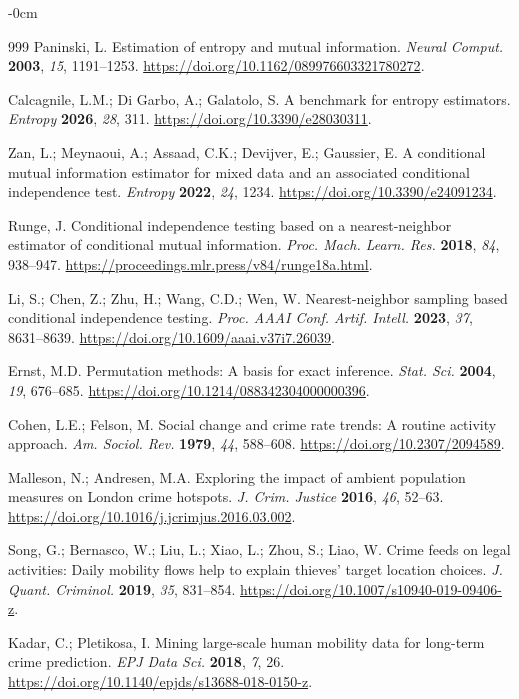 \documentclass[applsci,article,submit,moreauthors]{Definitions/mdpi}
\begin{document}
\begin{adjustwidth}{-\extralength}{0cm}
\begin{thebibliography}{999}
Paninski, L. Estimation of entropy and mutual information. \emph{Neural Comput.} \textbf{2003}, \emph{15}, 1191--1253. \url{https://doi.org/10.1162/089976603321780272}.

Calcagnile, L.M.; Di Garbo, A.; Galatolo, S. A benchmark for entropy
estimators. \emph{Entropy} \textbf{2026}, \emph{28}, 311.
\url{https://doi.org/10.3390/e28030311}.

Zan, L.; Meynaoui, A.; Assaad, C.K.; Devijver, E.; Gaussier, E. A conditional mutual information estimator for mixed data and an associated conditional independence test. \emph{Entropy} \textbf{2022}, \emph{24}, 1234. \url{https://doi.org/10.3390/e24091234}.

Runge, J. Conditional independence testing based on a nearest-neighbor estimator of conditional mutual information. \emph{Proc. Mach. Learn. Res.} \textbf{2018}, \emph{84}, 938--947. \url{https://proceedings.mlr.press/v84/runge18a.html}.

Li, S.; Chen, Z.; Zhu, H.; Wang, C.D.; Wen, W. Nearest-neighbor sampling based conditional independence testing. \emph{Proc. AAAI Conf. Artif. Intell.} \textbf{2023}, \emph{37}, 8631--8639. \url{https://doi.org/10.1609/aaai.v37i7.26039}.

Ernst, M.D. Permutation methods: A basis for exact inference. \emph{Stat. Sci.} \textbf{2004}, \emph{19}, 676--685. \url{https://doi.org/10.1214/088342304000000396}.

Cohen, L.E.; Felson, M. Social change and crime rate trends: A routine
activity approach. \emph{Am. Sociol. Rev.} \textbf{1979}, \emph{44},
588--608. \url{https://doi.org/10.2307/2094589}.

Malleson, N.; Andresen, M.A. Exploring the impact of ambient population
measures on London crime hotspots. \emph{J. Crim. Justice} \textbf{2016},
\emph{46}, 52--63.
\url{https://doi.org/10.1016/j.jcrimjus.2016.03.002}.

Song, G.; Bernasco, W.; Liu, L.; Xiao, L.; Zhou, S.; Liao, W. Crime feeds
on legal activities: Daily mobility flows help to explain thieves' target
location choices. \emph{J. Quant. Criminol.} \textbf{2019}, \emph{35},
831--854. \url{https://doi.org/10.1007/s10940-019-09406-z}.

Kadar, C.; Pletikosa, I. Mining large-scale human mobility data for long-term
crime prediction. \emph{EPJ Data Sci.} \textbf{2018}, \emph{7}, 26.
\url{https://doi.org/10.1140/epjds/s13688-018-0150-z}.


\end{thebibliography}
\end{adjustwidth}
\end{document}
